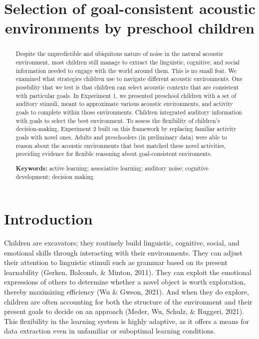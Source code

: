 \documentclass[10pt, letterpaper]{article}
\title{Selection of goal-consistent acoustic environments by preschool
children}
\begin{document}
\maketitle

\begin{abstract}
Despite the unpredictible and ubiquitous nature of noise in the natural
acoustic environment, most children still manage to extract the
linguistic, cognitive, and social information needed to engage with the
world around them. This is no small feat. We examined what strategies
children use to navigate different acoustic environments. One possbility
that we test is that children can select acoustic contexts that are
consistent with particular goals. In Experiment 1, we presented
preschool children with a set of auditory stimuli, meant to approximate
various acoustic environments, and activity goals to complete within
those environments. Children integrated auditory information with goals
to select the best environment. To assess the flexibility of children's
decision-making, Experiment 2 built on this framework by replacing
familiar activity goals with novel ones. Adults and preschoolers (in
preliminary data) were able to reason about the acoustic environments
that best matched these novel activities, providing evidence for
flexible reasoning about goal-consistent enviroments.

\textbf{Keywords:}
active learning; associative learning; auditory noise; cognitive
development; decision making
\end{abstract}

\hypertarget{introduction}{%
\section{Introduction}\label{introduction}}

Children are excavators; they routinely build linguistic, cognitive,
social, and emotional skills through interacting with their
environments. They can adjust their attention to linguistic stimuli such
as grammar based on its present learnability (Gerken, Balcomb, \&
Minton, 2011). They can exploit the emotional expressions of others to
determine whether a novel object is worth exploration, thereby
maximizing efficiency (Wu \& Gweon, 2021). And when they do explore,
children are often accounting for both the structure of the environment
and their present goals to decide on an approach (Meder, Wu, Schulz, \&
Ruggeri, 2021). This flexibility in the learning system is highly
adaptive, as it offers a means for data extraction even in unfamiliar or
suboptimal learning conditions.
\end{document}

